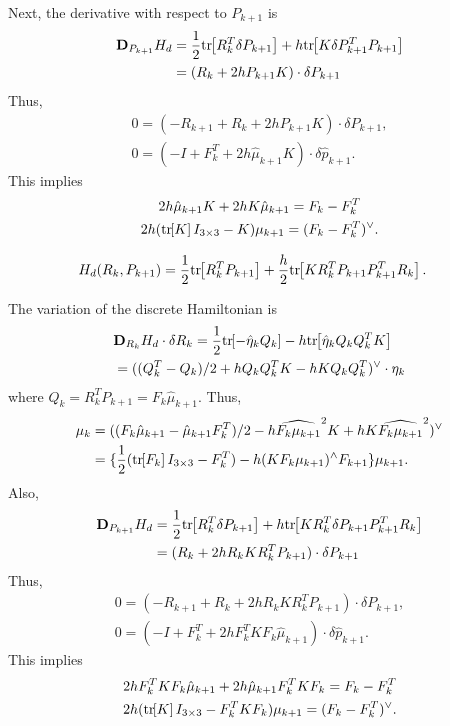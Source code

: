 \documentclass[letterpaper, 10pt, conference]{ieeeconf}
\newcommand{\bracket}[1]{\ensuremath{\left[ #1 \right]}}
\newcommand{\tr}[1]{\mbox{tr}\ensuremath{\negthickspace\bracket{#1}}}
\newcommand{\D}{\ensuremath{\mathbf{D}}}
\begin{document}
Next, the derivative with respect to $P_{k+1}$ is 
\begin{align*}
    \D_{P_{k+1}} H_d & = \frac{1}{2}\tr{ R_k^T \delta P_{k+1}} + h\tr{K \delta P_{k+1}^T P_{k+1} } \\
                     & = ( R_k + 2h P_{k+1}K ) \cdot \delta P_{k+1}
\end{align*}
Thus, 
\begin{gather*}
0 = (- R_{k+1} +  R_k + 2h P_{k+1}K ) \cdot \delta P_{k+1},\\
0 = (- I +  F_k^T + 2h \hat\mu_{k+1} K ) \cdot \delta \hat p_{k+1}.
\end{gather*}
This implies
\begin{gather}
    2h \hat\mu_{k+1} K + 2h K \hat\mu_{k+1} = F_k - F_k^T\nonumber\\
2h (\tr{K}I_{3\times 3} - K )\mu_{k+1} = (F_k- F_k^T)^\vee.
\end{gather}


\begin{align*}
    H_d (R_k, P_{k+1}) 
    & = \frac{1}{2}\tr{R_k^T P_{k+1}}   + \frac{h}{2} \tr{ K R_k^T P_{k+1} P_{k+1}^T R_k }.
\end{align*}

The variation of the discrete Hamiltonian is
\begin{align*}
    & \D_{R_k} H_d \cdot \delta R_k =\frac{1}{2} \tr{-\hat\eta_k Q_k} - h \tr{\hat\eta_k Q_kQ_k^T K } \\
    & = ( (Q_k^T- Q_k)/2 +h Q_kQ_k^TK  - hK Q_k Q_k^T)^\vee\cdot \eta_k
\end{align*}
where $Q_k = R_k^T P_{k+1} = F_k \hat\mu_{k+1}$.
Thus,
\begin{align}
    \mu_k 
          & = ((F_k\hat\mu_{k+1}-\hat\mu_{k+1}F_k^T)/2 - h \widehat{F_k\mu_{k+1}}^2 K +  h K \widehat{F_k\mu_{k+1}}^2)^\vee\nonumber \\
          & = \{ \frac{1}{2}(\tr{F_k}I_{3\times 3}-F_k^T) -h (KF_k\mu_{k+1})^\wedge F_{k+1}  \}  \mu_{k+1}.
\end{align}
Also,
\begin{align*}
    \D_{P_{k+1}} H_d & = \frac{1}{2}\tr{ R_k^T \delta P_{k+1}} + h\tr{KR_k^T \delta P_{k+1} P_{k+1}^T R_k} \\
                     & = ( R_k + 2h R_k K R_k^T P_{k+1}) \cdot \delta P_{k+1}
\end{align*}
Thus, 
\begin{gather*}
0 = (- R_{k+1} +  R_k + 2h R_k K R_k^T P_{k+1}) \cdot \delta P_{k+1},\\
0 = (- I +  F_k^T + 2h F_k^T K F_k \hat\mu_{k+1}) \cdot \delta \hat p_{k+1}.
\end{gather*}
This implies
\begin{gather}
2h F_k^T K F_k \hat\mu_{k+1} + 2h \hat\mu_{k+1} F_k^T K F_k = F_k - F_k^T\nonumber\\
2h (\tr{K}I_{3\times 3} - F_k^T K F_k)\mu_{k+1} = (F_k- F_k^T)^\vee.
\end{gather}




\end{document}
